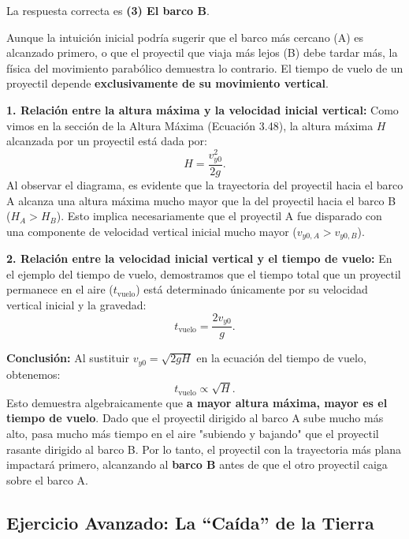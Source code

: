\documentclass[11pt,a4paper]{book}
\begin{document}
La respuesta correcta es \textbf{(3) El barco B}. 

Aunque la intuición inicial podría sugerir que el barco más cercano (A) es alcanzado primero, o que el proyectil que viaja más lejos (B) debe tardar más, la física del movimiento parabólico demuestra lo contrario. El tiempo de vuelo de un proyectil depende \textbf{exclusivamente de su movimiento vertical}.

\textbf{1. Relación entre la altura máxima y la velocidad inicial vertical:}
Como vimos en la sección de la Altura Máxima (Ecuación 3.48), la altura máxima $H$ alcanzada por un proyectil está dada por:
\begin{equation}
    H = \frac{v_{y0}^2}{2g}.
\end{equation}
Al observar el diagrama, es evidente que la trayectoria del proyectil hacia el barco A alcanza una altura máxima mucho mayor que la del proyectil hacia el barco B ($H_A > H_B$). Esto implica necesariamente que el proyectil A fue disparado con una componente de velocidad vertical inicial mucho mayor ($v_{y0, A} > v_{y0, B}$).

\textbf{2. Relación entre la velocidad inicial vertical y el tiempo de vuelo:}
En el ejemplo del tiempo de vuelo, demostramos que el tiempo total que un proyectil permanece en el aire ($t_{\text{vuelo}}$) está determinado únicamente por su velocidad vertical inicial y la gravedad:
\begin{equation}
    t_{\text{vuelo}} = \frac{2v_{y0}}{g}.
\end{equation}

\textbf{Conclusión:}
Al sustituir $v_{y0} = \sqrt{2gH}$ en la ecuación del tiempo de vuelo, obtenemos:
\begin{equation}
    t_{\text{vuelo}} \propto \sqrt{H}.
\end{equation}
Esto demuestra algebraicamente que \textbf{a mayor altura máxima, mayor es el tiempo de vuelo}. Dado que el proyectil dirigido al barco A sube mucho más alto, pasa mucho más tiempo en el aire "subiendo y bajando" que el proyectil rasante dirigido al barco B. Por lo tanto, el proyectil con la trayectoria más plana impactará primero, alcanzando al \textbf{barco B} antes de que el otro proyectil caiga sobre el barco A.

\subsection{Ejercicio Avanzado: La ``Caída'' de la Tierra}
\end{document}
